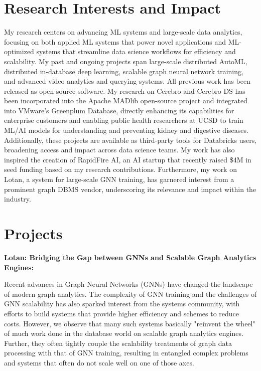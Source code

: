 \documentclass[margin,line]{res}
\begin{document}
\begin{resume}
\section{\sc Research Interests and Impact}
My research centers on advancing ML systems and large-scale data analytics, focusing on both applied ML systems that power novel applications and ML-optimized systems that streamline data science workflows for efficiency and scalability. My past and ongoing projects span large-scale distributed AutoML, distributed in-database deep learning, scalable graph neural network training, and advanced video analytics and querying systems. All previous work has been released as open-source software. My research on Cerebro and Cerebro-DS has been incorporated into the Apache MADlib open-source project and integrated into VMware’s Greenplum Database, directly enhancing its capabilities for enterprise customers and enabling public health researchers at UCSD to train ML/AI models for understanding and preventing kidney and digestive diseases. Additionally, these projects are available as third-party tools for Databricks users, broadening access and impact across data science teams. My work has also inspired the creation of RapidFire AI, an AI startup that recently raised \$4M in seed funding based on my research contributions. Furthermore, my work on Lotan, a system for large-scale GNN training, has garnered interest from a prominent graph DBMS vendor, underscoring its relevance and impact within the industry.

\section{\sc Projects}
{\bf Lotan: Bridging the Gap between GNNs and Scalable Graph Analytics Engines:}

Recent advances in Graph Neural Networks (GNNs) have changed the landscape of modern graph analytics. The complexity of GNN training and the challenges of GNN scalability has also sparked interest from the systems community, with efforts to build systems that provide higher efficiency and schemes to reduce costs. However, we observe that many such systems basically "reinvent the wheel" of much work done in the database world on scalable graph analytics engines. Further, they often tightly couple the scalability treatments of graph data processing with that of GNN training, resulting in entangled complex problems and systems that often do not scale well on one of those axes.


\end{resume}
\end{document}
